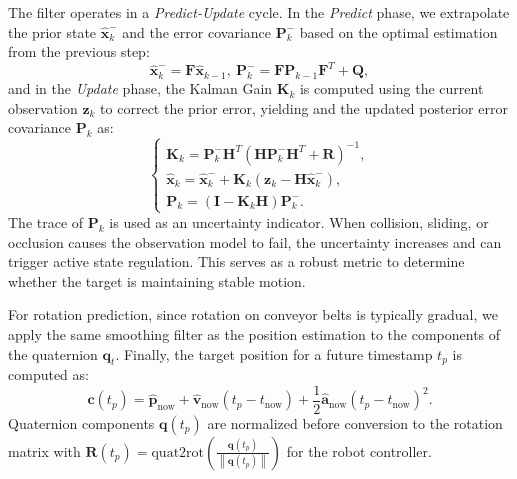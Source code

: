 The filter operates in a \textit{Predict-Update} cycle.   In the \textit{Predict} phase, we extrapolate the prior state $\hat{\boldsymbol{x}}_{k}^{-}$ and the error covariance $\boldsymbol{P}_{k}^{-}$ based on the optimal estimation  from the previous step: 
\begin{equation}
\hat{\boldsymbol{x}}_{k}^{-}=\boldsymbol{F}\hat{\boldsymbol{x}}_{k-1},\
\boldsymbol{P}_{k}^{-}=\boldsymbol{F}\boldsymbol{P}_{k-1}\boldsymbol{F}^{T}+\boldsymbol{Q},
\label{eq:kf_predict}
\end{equation}
and in the \textit{Update} phase, the Kalman Gain $\boldsymbol{K}_{k}$ is computed using the current observation $\boldsymbol{z}_k$ to correct the prior error, yielding   and the updated posterior error covariance $\boldsymbol{P}_{k}$ as:
\begin{equation}
\begin{cases}
    \boldsymbol{K}_{k}=\boldsymbol{P}_{k}^{-}\boldsymbol{H}^{T}(\boldsymbol{H}\boldsymbol{P}_{k}^{-}\boldsymbol{H}^{T}+\boldsymbol{R})^{-1}, \\
\hat{\boldsymbol{x}}_{k}=\hat{\boldsymbol{x}}_{k}^{-}+\boldsymbol{K}_{k}(\boldsymbol{z}_{k}-\boldsymbol{H}\hat{\boldsymbol{x}}_{k}^{-}), \\
\boldsymbol{P}_{k}=(\boldsymbol{I}-\boldsymbol{K}_{k}\boldsymbol{H})\boldsymbol{P}_{k}^{-}.
\end{cases}
\end{equation}
The trace of $\boldsymbol{P}_{k}$ is used as an uncertainty indicator. When collision, sliding, or occlusion causes the observation model to fail, the uncertainty increases and can trigger active state regulation. This serves as a robust metric to determine whether the target is maintaining stable motion. 

For rotation prediction, since rotation on conveyor belts is typically gradual, we apply the same smoothing filter as the position estimation to the components of the quaternion $\boldsymbol{q}_t$. Finally, the target position for a future timestamp $t_p$ is computed as:
\begin{equation}
\boldsymbol{c}(t_p)=\hat{\boldsymbol{p}}_{\text{now}}+\hat{\boldsymbol{v}}_{\text{now}}(t_p-t_{\text{now}})+\frac{1}{2}\hat{\boldsymbol{a}}_{\text{now}}(t_p-t_{\text{now}})^2.
\end{equation}
Quaternion components $\boldsymbol{q}(t_p)$ are normalized before conversion to the rotation matrix with $\boldsymbol{R}(t_p) = \mathrm{quat2rot}(\frac{\boldsymbol{q}(t_p)}{\left \| \boldsymbol{q}(t_p) \right \| })$ for the robot controller.


